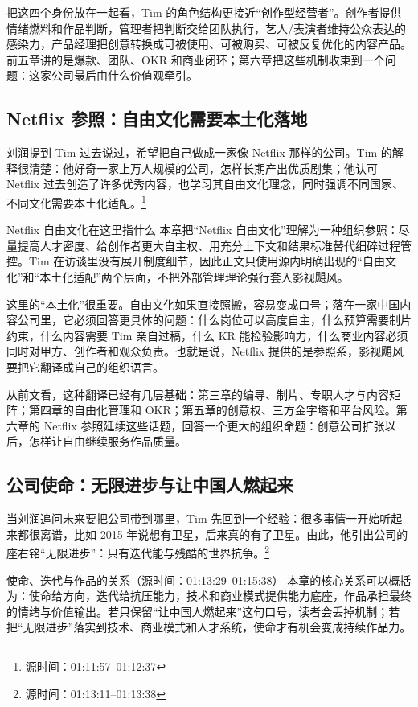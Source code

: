 把这四个身份放在一起看，Tim 的角色结构更接近“创作型经营者”。创作者提供情绪燃料和作品判断，管理者把判断交给团队执行，艺人/表演者维持公众表达的感染力，产品经理把创意转换成可被使用、可被购买、可被反复优化的内容产品。前五章讲的是爆款、团队、OKR 和商业闭环；第六章把这些机制收束到一个问题：这家公司最后由什么价值观牵引。

\subsection{Netflix 参照：自由文化需要本土化落地}

刘润提到 Tim 过去说过，希望把自己做成一家像 Netflix 那样的公司。Tim 的解释很清楚：他好奇一家上万人规模的公司，怎样长期产出优质剧集；他认可 Netflix 过去创造了许多优秀内容，也学习其自由文化理念，同时强调不同国家、不同文化需要本土化适配。\footnote{源时间：01:11:57--01:12:37}

\begin{knowledgebox}{Netflix 自由文化在这里指什么}
本章把“Netflix 自由文化”理解为一种组织参照：尽量提高人才密度、给创作者更大自主权、用充分上下文和结果标准替代细碎过程管控。Tim 在访谈里没有展开制度细节，因此正文只使用源内明确出现的“自由文化”和“本土化适配”两个层面，不把外部管理理论强行套入影视飓风。
\end{knowledgebox}

这里的“本土化”很重要。自由文化如果直接照搬，容易变成口号；落在一家中国内容公司里，它必须回答更具体的问题：什么岗位可以高度自主，什么预算需要制片约束，什么内容需要 Tim 亲自过稿，什么 KR 能检验影响力，什么商业内容必须同时对甲方、创作者和观众负责。也就是说，Netflix 提供的是参照系，影视飓风要把它翻译成自己的组织语言。

从前文看，这种翻译已经有几层基础：第三章的编导、制片、专职人才与内容矩阵；第四章的自由化管理和 OKR；第五章的创意权、三方金字塔和平台风险。第六章的 Netflix 参照延续这些话题，回答一个更大的组织命题：创意公司扩张以后，怎样让自由继续服务作品质量。

\subsection{公司使命：无限进步与让中国人燃起来}

当刘润追问未来要把公司带到哪里，Tim 先回到一个经验：很多事情一开始听起来都很离谱，比如 2015 年说想有卫星，后来真的有了卫星。由此，他引出公司的座右铭“无限进步”：只有迭代能与残酷的世界抗争。\footnote{源时间：01:13:11--01:13:38}

\begin{importantbox}{使命、迭代与作品的关系（源时间：01:13:29--01:15:38）}
本章的核心关系可以概括为：使命给方向，迭代给抗压能力，技术和商业模式提供能力底座，作品承担最终的情绪与价值输出。若只保留“让中国人燃起来”这句口号，读者会丢掉机制；若把“无限进步”落实到技术、商业模式和人才系统，使命才有机会变成持续作品力。
\end{importantbox}

